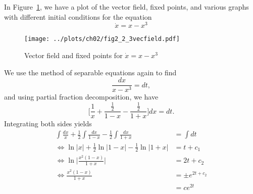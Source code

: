 
In Figure~\ref{fig2_2_3vecfield}, we have a plot of the vector field, fixed points,
and various graphs with different initial conditions for the equation 
\[
    \dot{x} = x - x^3
\]
\begin{figure}[!ht]
    \texttt{[image: ../plots/ch02/fig2\_2\_3vecfield.pdf]}
    \caption{Vector field and fixed points for $\dot{x} = x - x^3$\label{fig2_2_3vecfield}}
\end{figure}

We use the method of separable equations again to find 
\[
    \frac{dx}{x - x^3} = dt,
\]
and using partial fraction decomposition, we have
\[
    \biggl[\frac{1}{x} + \frac{\frac{1}{2}}{1 - x} - \frac{\frac{1}{2}}{1 + x} \biggr]dx
    = dt.
\]
Integrating both sides yields
\begin{equation*}
    \begin{split}
        \int \frac{dx}{x} + \frac{1}{2}\int \frac{dx}{1 - x} - \frac{1}{2}\int \frac{dx}{1 + x}
        &= \int dt \\
        \Leftrightarrow \ln{\lvert x \rvert} + \frac{1}{2}\ln{\lvert 1 - x \rvert}
        - \frac{1}{2}\ln{\lvert 1 + x \rvert}
        &= t + c_1 \\
        \Leftrightarrow \ln{\biggl \lvert \frac{x^2(1 - x)}{1 + x} \biggr \rvert}
        &= 2t + c_2 \\
        \Leftrightarrow \frac{x^2(1 - x)}{1 + x}
        &= \pm e^{2t + c_2} \\
        &= ce^{2t}
    \end{split}
\end{equation*}
